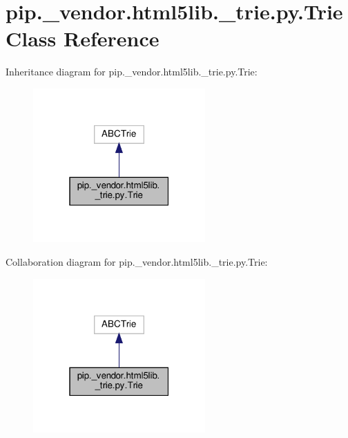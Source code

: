 \hypertarget{classpip_1_1__vendor_1_1html5lib_1_1__trie_1_1py_1_1Trie}{}\section{pip.\+\_\+vendor.\+html5lib.\+\_\+trie.\+py.\+Trie Class Reference}
\label{classpip_1_1__vendor_1_1html5lib_1_1__trie_1_1py_1_1Trie}


Inheritance diagram for pip.\+\_\+vendor.\+html5lib.\+\_\+trie.\+py.\+Trie\+:
\nopagebreak
\begin{figure}[H]
\begin{center}
\leavevmode
\includegraphics[width=187pt]{classpip_1_1__vendor_1_1html5lib_1_1__trie_1_1py_1_1Trie__inherit__graph}
\end{center}
\end{figure}


Collaboration diagram for pip.\+\_\+vendor.\+html5lib.\+\_\+trie.\+py.\+Trie\+:
\nopagebreak
\begin{figure}[H]
\begin{center}
\leavevmode
\includegraphics[width=187pt]{classpip_1_1__vendor_1_1html5lib_1_1__trie_1_1py_1_1Trie__coll__graph}
\end{center}
\end{figure}
